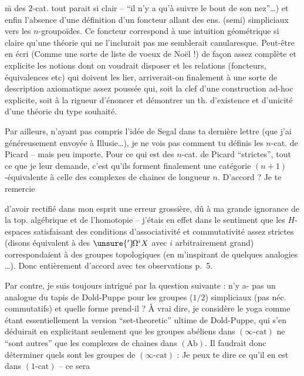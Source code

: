 \={m} des $2$-cat. tout parait si clair -- ``il n'y a qu'à suivre le bout de son nez''\dots) et enfin l'absence d'une définition d'un foncteur allant des ens. (semi) simpliciaux vers les $n$-groupoïdes. Ce foncteur correspond à une intuition géométrique si claire qu'une théorie qui ne l'inclurait pas me semblerait canularesque. Peut-être en écri (Comme une sorte de liste de voeux de Noël !) de façon assez complète et explicite les  notions dont on voudrait disposer et les relations (foncteurs, équivalences etc) qui doivent les lier, arriverait-on finalement à une sorte de description axiomatique assez poussée qui, soit  la clef d'une construction ad-hoc explicite, soit  à la rigueur d'énoncer et démontrer un th. d'existence et d'unicité d'une théorie du type souhaité.

Par ailleurs, n'ayant pas compris l'idée de Segal dans ta dernière lettre (que j'ai généreusement envoyée à Illusie\dots), je ne vois pas comment tu définis les $n$-cat. de Picard -- mais peu importe. Pour ce qui est des $n$-cat. de Picard ``strictes'', tout ce que je leur demande, c'est qu'ils forment finalement une catégorie $(n+1)$-équivalente à celle des complexes de chaines de longueur\unsure{,} $n$. D'accord ? Je te remercie

d'avoir rectifié dans mon esprit une erreur grossière, dû à ma grande ignorance de la top. algébrique et de l'homotopie -- j'étais en effet dans le sentiment que les $H$-espaces satisfaisant des conditions d'associativité et commutativité assez strictes (disons équivalent à des $\unsure{{}'}\!\Omega^{i}X$ avec $i$ arbitrairement grand) correspondaient à des groupes topologiques  (en m'inspirant de quelques analogies \dots). Donc entièrement d'accord avec tes observations p.~5.

Par contre, je suis toujours intrigué par la question suivante : n'y a- pas un analogue du tapis de Dold-Puppe pour les groupes ($1/2$) simpliciaux (pas néc. commutatifs) et quelle forme prend-il ? À vrai dire, je considère le yoga
comme étant essentiellement la version ``set-theoretic'' ultime de Dold-Puppe, qui s'en déduirait en explicitant seulement que les groupes abéliens dans $(\infty\text{-cat})$ ne ``sont autres'' que les complexes de chaines dans $(\mathrm{Ab})$. Il faudrait donc déterminer quels sont les groupes de $(\infty\text{-cat})$ : Je peux te dire ce qu'il en est dans $(1\text{-cat})$ -- ce sera %

